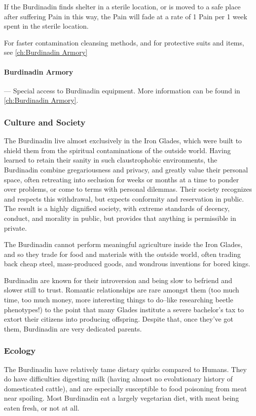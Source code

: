 \documentclass[oneside,11pt,english]{book}
\begin{document}
If the Burdinadin finds shelter in a sterile location, or is moved to a safe place after suffering Pain 
in this way, the Pain will fade at a rate of 1 Pain per 1 week spent in the sterile location.

For faster contamination cleansing methods, and for protective suits and items, see \autoref{ch:Burdinadin Armory}

\paragraph{Burdinadin Armory}---\quad
Special access to Burdinadin equipment. More information can be found in \autoref{ch:Burdinadin Armory}.


\subsubsection*{Culture and Society} 
The Burdinadin live almost exclusively in the Iron Glades, which were built to shield them from the 
spiritual contaminations of the outside world. Having learned to retain their sanity in such claustrophobic 
environments, the Burdinadin combine gregariousness and privacy, and greatly value their personal 
space, often retreating into seclusion for weeks or months at a time to ponder over problems, or come to 
terms with personal dilemmas. Their society recognizes and respects this withdrawal, but expects 
conformity and reservation in public. The result is a highly dignified society, with extreme standards of 
decency, conduct, and morality in public, but provides that anything is permissible in private. 

 

The Burdinadin cannot perform meaningful agriculture inside the Iron Glades, and so they trade for food 
and materials with the outside world, often trading back cheap steel, mass-produced goods, and wondrous 
inventions for bored kings. 

 


Burdinadin are known for their introversion and being slow to befriend and slower still to trust. Romantic 
relationships are rare amongst them (too much time, too much money, more interesting things to do--like 
researching beetle phenotypes!) to the point that many Glades institute a severe bachelor’s tax to extort 
their citizens into producing offspring. Despite that, once they’ve got them, Burdinadin are very dedicated 
parents. 

 

\subsubsection*{Ecology} 
The Burdinadin have relatively tame dietary quirks compared to Humans. They do have difficulties 
digesting milk (having almost no evolutionary history of domesticated cattle), and are especially 
susceptible to food poisoning from meat near spoiling. Most Burdinadin eat a largely vegetarian diet, with 
meat being eaten fresh, or not at all. 
\end{document}
